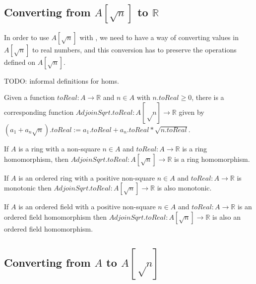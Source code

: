 \subsection{Converting from $A[\sqrt{n}]$ to $ℝ$}

In order to use $A[\sqrt{n}]$ with , we need to have a way of
converting values in $A[\sqrt{n}]$ to real numbers, and this conversion has to preserve
the operations defined on $A[\sqrt{n}]$.

TODO: informal definitions for homs.


\begin{definition}
  \label{def:adjoinToReal}
  Given a function $toReal : A → ℝ$ and $n ∈ A$ with $n.toReal \geq 0$,
  there is a corresponding function $AdjoinSqrt.toReal : A[√n] → ℝ$ given by
  $(a_1 + a_n\sqrt{n}).toReal := a_1.toReal + a_n.toReal * \sqrt{n.toReal}$.
\end{definition}

\begin{lemma}
  \label{thm:adjoinToRealRingHom}
  If $A$ is a ring with a non-square $n ∈ A$ and $toReal : A → ℝ$ is a
  ring homomorphism, then $AdjoinSqrt.toReal : A[\sqrt{n}] → ℝ$ is a ring
  homomorphism.
\end{lemma}

\begin{lemma}
  \label{thm:adjoinToRealOrderHom}
  If $A$ is an ordered ring with a positive non-square $n ∈ A$ and
  $toReal : A → ℝ$ is monotonic then $AdjoinSqrt.toReal : A[\sqrt{n}] → ℝ$ is
  also monotonic.
\end{lemma}


\begin{lemma}
  \label{thm:adjoinToRealOrderedFieldHom}
  If $A$ is an ordered field with a positive non-square $n ∈ A$ and $toReal : A
  → ℝ$ is an ordered field homomorphism then $AdjoinSqrt.toReal : A[\sqrt{n}] →
  ℝ$ is also an ordered field homomorphism.
\end{lemma}

\subsection{Converting from $A$ to $A[√n]$}

